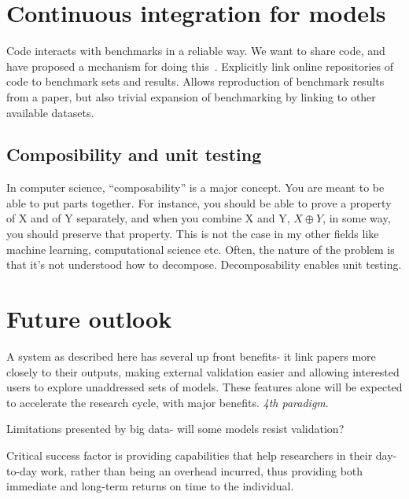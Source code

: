 \documentclass[conference]{IEEEtran}
\begin{document}
\section{Continuous integration for models}



Code interacts with benchmarks in a reliable way. We want to share
code, and have proposed a mechanism for doing this~\cite{crick-et-al_wssspe2}.
Explicitly link online repositories of code to benchmark sets and
results. Allows reproduction of benchmark results from a paper, 
but also trivial expansion of benchmarking by linking to other 
available datasets.

\subsection{Composibility and unit testing}

In computer science, ``composability'' is a major concept. You are
meant to be able to put parts together. For instance, you should be
able to prove a property of X and of Y separately, and when you
combine X and Y, $X \oplus Y$, in some way, you should preserve that
property.  This is not the case in my other fields like machine
learning, computational science etc. Often, the nature of the problem
is that it's not understood how to decompose. Decomposability 
enables unit testing. 




\section{Future outlook}

A system as described here has several up front benefits- it link papers 
more closely to their outputs, making external validation easier and 
allowing interested users to explore unaddressed sets of models. These 
features alone will be expected to accelerate the research cycle, with
major benefits. \emph{4th paradigm}.

Limitations presented by big data- will some models resist validation?

Critical success factor is providing capabilities that help researchers 
in their day-to-day work, rather than being an overhead incurred, thus 
providing both immediate and long-term returns on time to the individual.





\end{document}
